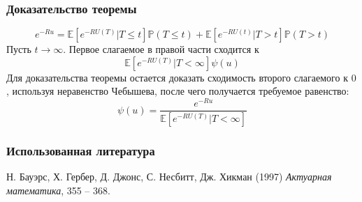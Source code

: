 \documentclass[10pt]{beamer}
\newcommand\E{\mathbb{E}}
\newcommand\Pro{\mathbb{P}}
\numberwithin{equation}{section}
\begin{document}
\begin{frame}
\frametitle{Доказательство теоремы}
\begin{equation}
e^{-Ru} = \E[e^{-RU(T)}|T \leq t]\Pro(T \leq t) + \E[e^{-RU(t)}|T > t]\Pro(T > t)
\end{equation}
Пусть $t \rightarrow \infty$. Первое слагаемое в правой части сходится к
\begin{equation}
\E[e^{-RU(T)}|T < \infty]\psi(u)
\end{equation}
\noindent
Для доказательства теоремы остается доказать сходимость второго слагаемого к $0$,
используя неравенство Чебышева, после чего получается требуемое равенство:
\begin{equation}
\psi(u) = \frac{e^{-Ru}}{\mathbb{E}[e^{-RU(T)}|T < \infty]}
\end{equation}
\end{frame}


\begin{frame}
\frametitle{Использованная литература}
\footnotesize{
\begin{thebibliography}{99}
 Н. Бауэрс, Х. Гербер,
Д. Джонс, С. Несбитт, Дж. Хикман (1997)
\newblock \emph{Актуарная математика}, 355 -- 368.
\end{thebibliography}
}
\end{frame}
\end{document}
